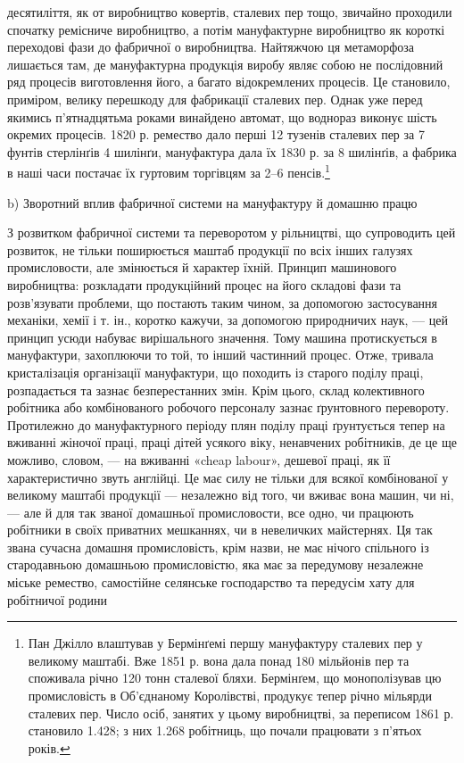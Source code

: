 \parcont{}  %
десятиліття, як от виробництво ковертів, сталевих пер тощо, звичайно
проходили спочатку ремісниче виробництво, а потім мануфактурне
виробництво як короткі переходові фази до фабричної о
виробництва. Найтяжчою ця метаморфоза лишається там, де мануфактурна
продукція виробу являє собою не послідовний ряд процесів
виготовлення його, а багато відокремлених процесів. Це становило,
приміром, велику перешкоду для фабрикації сталевих пер.
Однак уже перед якимись п’ятнадцятьма роками винайдено автомат,
що воднораз виконує шість окремих процесів. 1820 р. ремество
дало перші 12 тузенів сталевих пер за 7 фунтів стерлінґів 4 шилінґи,
мануфактура дала їх 1830 р. за 8 шилінґів, а фабрика в
наші часи постачає їх гуртовим торгівцям за 2--6 пенсів.\footnote{
Пан Джілло влаштував у Бермінґемі першу мануфактуру сталевих
пер у великому маштабі. Вже 1851 р. вона дала понад 180 мільйонів пер
та споживала річно 120 тонн сталевої бляхи. Бермінґем, що монополізував
цю промисловість в Об’єднаному Королівстві, продукує тепер річно
мільярди сталевих пер. Число осіб, занятих у цьому виробництві, за
переписом 1861 р. становило 1.428; з них 1.268 робітниць, що почали
працювати з п’ятьох років.
}

b) Зворотний вплив фабричної системи
на мануфактуру й домашню працю

З розвитком фабричної системи та переворотом у рільництві, що
супроводить цей розвиток, не тільки поширюється маштаб продукції
по всіх інших галузях промисловости, але змінюється й характер
їхній. Принцип машинового виробництва: розкладати продукційний
процес на його складові фази та розв’язувати проблеми,
що постають таким чином, за допомогою застосування механіки,
хемії і т. ін., коротко кажучи, за допомогою природничих наук, —
цей принцип усюди набуває вирішального значення. Тому машина
протискується в мануфактури, захоплюючи то той, то інший
частинний процес. Отже, тривала кристалізація організації мануфактури,
що походить із старого поділу праці, розпадається
та зазнає безперестанних змін. Крім цього, склад колективного
робітника або комбінованого робочого персоналу зазнає ґрунтовного
перевороту. Протилежно до мануфактурного періоду
плян поділу праці ґрунтується тепер на вживанні жіночої праці,
праці дітей усякого віку, ненавчених робітників, де це ще
можливо, словом, — на вживанні «cheap labour», дешевої праці,
як її характеристично звуть англійці. Це має силу не тільки для
всякої комбінованої у великому маштабі продукції — незалежно
від того, чи вживає вона машин, чи ні, — але й для так званої
домашньої промисловости, все одно, чи працюють робітники в
своїх приватних мешканнях, чи в невеличких майстернях. Ця
так звана сучасна домашня промисловість, крім назви, не має
нічого спільного із стародавньою домашньою промисловістю,
яка має за передумову незалежне міське ремество, самостійне
селянське господарство та передусім хату для робітничої родини
\parbreak{}  %
